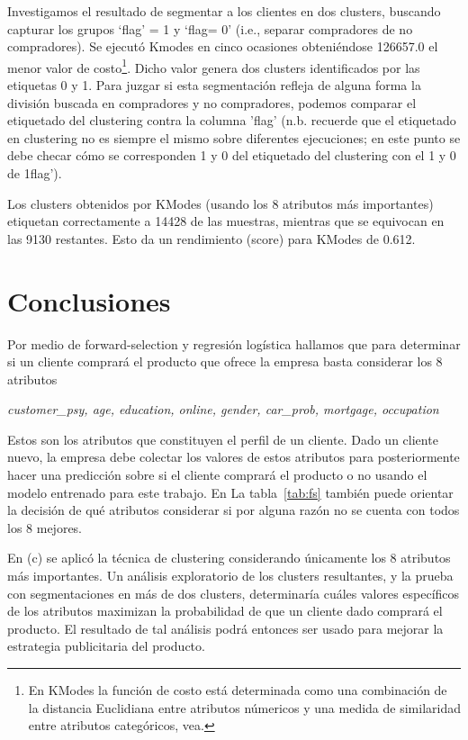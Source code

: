 \documentclass[letterpaper,11pt]{article}
\begin{document}
\begin{multicols}{2}
Investigamos el resultado de  segmentar a los clientes en dos clusters, buscando capturar los grupos 
`flag' = 1 y `flag= 0' (i.e., separar compradores de no compradores). Se ejecutó Kmodes en cinco ocasiones obteniéndose 126657.0
el menor valor de costo\footnote{En KModes la función de costo está determinada como una combinación de la distancia
    Euclidiana entre atributos númericos y una medida de similaridad entre atributos categóricos, vea\cite[Sec.
2.2]{kmodes}.}. Dicho valor genera dos clusters identificados por las etiquetas 0 y 1. Para juzgar si esta segmentación
refleja de alguna forma la división buscada en compradores y no compradores, podemos comparar el etiquetado del
clustering contra la columna 'flag' (n.b. recuerde que el etiquetado en clustering no es siempre el mismo sobre
    diferentes ejecuciones; en este punto se debe checar cómo se corresponden 1 y 0 del etiquetado del
clustering con el 1 y 0 de 1flag').

Los clusters obtenidos por KModes (usando los 8 atributos más importantes) etiquetan correctamente a 14428 de las
muestras, mientras que se equivocan en las 9130  restantes. Esto da un rendimiento (score) para KModes de 0.612.

\section{Conclusiones}
Por medio de forward-selection y regresión logística hallamos que para determinar si un cliente comprará el producto que
ofrece la empresa basta considerar los 8 atributos
\begin{center} \em customer\_psy, age, education, online, gender, 
car\_prob, mortgage, occupation
\end{center}
Estos son los atributos que constituyen el perfil de un cliente. Dado un cliente nuevo, la empresa debe colectar los
valores de estos atributos para posteriormente hacer una predicción sobre si el cliente comprará el producto o no usando el 
modelo entrenado para este trabajo. En 
La tabla~\ref{tab:fs} también puede orientar la decisión de qué atributos considerar si por alguna razón no se cuenta
con todos los 8 mejores. 

En (c) se aplicó la técnica de clustering considerando únicamente los 8 atributos más importantes. Un análisis
exploratorio  de los clusters resultantes, y la prueba con segmentaciones en más de dos clusters, determinaría cuáles
valores específicos de los atributos maximizan la probabilidad de que un cliente dado comprará el producto. El resultado
de tal análisis podrá entonces ser usado para mejorar la estrategia publicitaria del producto.


\end{multicols}
\end{document}
